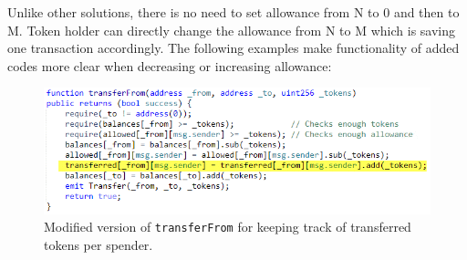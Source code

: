 Unlike other solutions, there is no need to set allowance from N to 0 and then to M. Token holder can directly change the allowance from N to M which is saving one transaction accordingly. The following examples make functionality of added codes more clear when decreasing or increasing allowance:
 
\begin{figure}[t]
	\centering
	\includegraphics[width=1.0\linewidth]{figures/multiple_withdrawal_14.png}
	\caption{Modified version of \texttt{transferFrom} for keeping track of transferred tokens per spender.\label{fig:transfer1}}
\end{figure}

